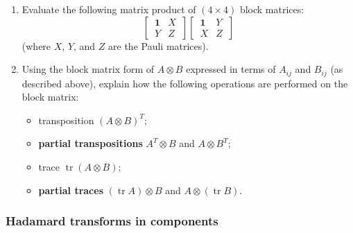 \documentclass[fleqn,a4paper]{article}
\providecommand{\tightlist}{\setlength{\itemsep}{0pt}\setlength{\parskip}{0pt}}
\theoremstyle{definition}
\theoremstyle{definition}
\theoremstyle{definition}
\theoremstyle{definition}
\theoremstyle{remark}
\begin{document}
\begin{enumerate}
\def\labelenumi{\arabic{enumi}.}
\item
  Evaluate the following matrix product of \((4\times 4)\) block matrices:
  \[
   \left[
   \,
     \begin{array}{c|c}
       \mathbf{1}& X
     \\\hline
       Y & Z
     \end{array}
   \,
   \right]
   \left[
   \,
     \begin{array}{c|c}
       \mathbf{1}& Y
     \\\hline
       X & Z
     \end{array}
   \,
   \right]
    \]
  (where \(X\), \(Y\), and \(Z\) are the Pauli matrices).
\item
  Using the block matrix form of \(A\otimes B\) expressed in terms of \(A_{ij}\) and \(B_{ij}\) (as described above), explain how the following operations are performed on the block matrix:

  \begin{itemize}
  \tightlist
  \item
    transposition \((A\otimes B)^T\);
  \item
    \textbf{partial transpositions} \(A^T\otimes B\) and \(A\otimes B^T\);
  \item
    trace \(\operatorname{tr}(A\otimes B)\);
  \item
    \textbf{partial traces} \((\operatorname{tr}A)\otimes B\) and \(A\otimes(\operatorname{tr}B)\).
  \end{itemize}
\end{enumerate}

\hypertarget{hadamard-transforms-in-components}{%
\subsubsection{Hadamard transforms in components}\label{hadamard-transforms-in-components}}
\end{document}
